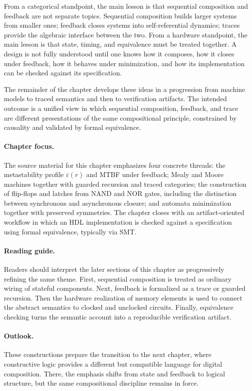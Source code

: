 \documentclass[11pt]{article}
\begin{document}
From a categorical standpoint, the main lesson is that sequential composition and feedback are not separate topics. Sequential composition builds larger systems from smaller ones; feedback closes systems into self-referential dynamics; traces provide the algebraic interface between the two. From a hardware standpoint, the main lesson is that state, timing, and equivalence must be treated together. A design is not fully understood until one knows how it composes, how it closes under feedback, how it behaves under minimization, and how its implementation can be checked against its specification.

The remainder of the chapter develops these ideas in a progression from machine models to traced semantics and then to verification artifacts. The intended outcome is a unified view in which sequential composition, feedback, and trace are different presentations of the same compositional principle, constrained by causality and validated by formal equivalence.

\paragraph{Chapter focus.} The source material for this chapter emphasizes four concrete threads: the metastability profile \(\varepsilon(r)\) and MTBF under feedback; Mealy and Moore machines together with guarded recursion and traced categories; the construction of flip-flops and latches from NAND and NOR gates, including the distinction between synchronous and asynchronous closure; and automata minimization together with preserved symmetries. The chapter closes with an artifact-oriented workflow in which an HDL implementation is checked against a specification using formal equivalence, typically via SMT.

\paragraph{Reading guide.} Readers should interpret the later sections of this chapter as progressively refining the same theme. First, sequential composition is treated as ordinary wiring of stateful components. Next, feedback is formalized as a trace or guarded recursion. Then the hardware realization of memory elements is used to connect the abstract semantics to clocked and unclocked circuits. Finally, equivalence checking turns the semantic account into a reproducible verification artifact.

\paragraph{Outlook.} These constructions prepare the transition to the next chapter, where constructive logic provides a different but compatible language for digital composition. There, the emphasis shifts from state and feedback to logical structure, but the same compositional discipline remains in force.
\end{document}
